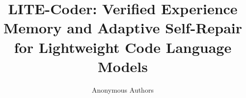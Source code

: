 \documentclass[10pt,journal,compsoc]{IEEEtran}
\begin{document}
\title{LITE-Coder: Verified Experience Memory and Adaptive Self-Repair for Lightweight Code Language Models}
\author{Anonymous Authors}



\maketitle


















\end{document}
